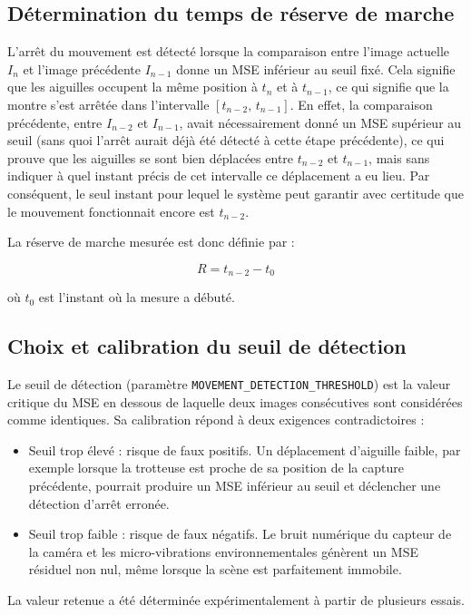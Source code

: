 \subsection{Détermination du temps de réserve de marche}

L'arrêt du mouvement est détecté lorsque la comparaison entre l'image actuelle $I_n$ et l'image précédente $I_{n-1}$ donne un MSE inférieur au seuil fixé.
Cela signifie que les aiguilles occupent la même position à $t_n$ et à $t_{n-1}$, ce qui signifie que la montre s'est arrêtée dans l'intervalle $[t_{n-2},\, t_{n-1}]$. En effet, la comparaison précédente, entre $I_{n-2}$ et $I_{n-1}$, avait nécessairement donné un MSE supérieur au seuil (sans quoi l'arrêt aurait déjà été détecté à cette étape précédente), ce qui prouve que les aiguilles se sont bien déplacées entre $t_{n-2}$ et $t_{n-1}$, mais sans indiquer à quel instant précis de cet intervalle ce déplacement a eu lieu.
Par conséquent, le seul instant pour lequel le système peut garantir avec certitude que le mouvement fonctionnait encore est $t_{n-2}$.

La réserve de marche mesurée est donc définie par :

\begin{equation}
    R = t_{n-2} - t_0
    \label{eq:reserve_marche}
\end{equation}

où $t_0$ est l'instant où la mesure a débuté.

\subsection{Choix et calibration du seuil de détection}

Le seuil de détection (paramètre \texttt{MOVEMENT\_DETECTION\_THRESHOLD})
est la valeur critique du MSE en dessous de laquelle deux images consécutives
sont considérées comme identiques. Sa calibration répond à deux exigences
contradictoires :

\begin{itemize}
    \item Seuil trop élevé : risque de faux positifs. Un déplacement
          d'aiguille faible, par exemple lorsque la trotteuse est proche de
          sa position de la capture précédente, pourrait produire un MSE
          inférieur au seuil et déclencher une détection d'arrêt erronée.

    \item Seuil trop faible : risque de faux négatifs. Le bruit
          numérique du capteur de la caméra et les micro-vibrations
          environnementales génèrent un MSE résiduel non nul, même lorsque
          la scène est parfaitement immobile.
\end{itemize}

La valeur retenue a été déterminée expérimentalement à partir de plusieurs
essais.

